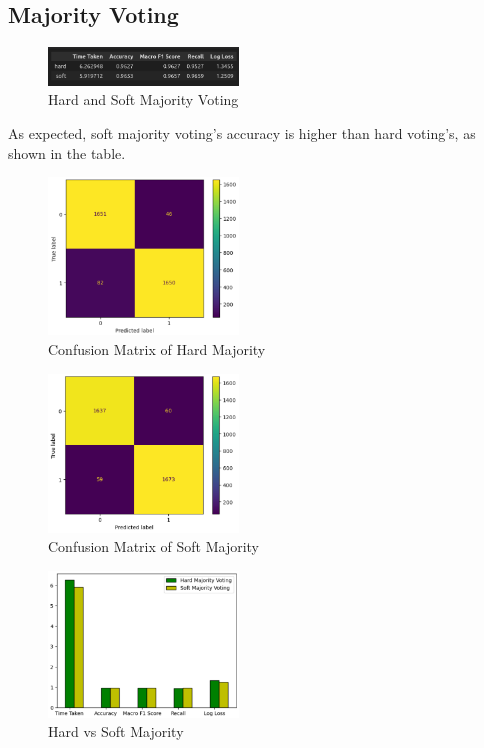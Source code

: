 \subsection{Majority Voting}
\begin{figure}[ht!]
    \centering
    \includegraphics[width = 0.45\textwidth]{./images/majority.png}
    \caption{Hard and Soft Majority Voting}
    \label{fig:6}
\end{figure}
As expected, soft majority voting's accuracy is higher than hard voting's, as shown in the table.
\begin{figure}[ht!]
    \centering
    \includegraphics[width = 0.45\textwidth]{./images/conf_hard.png}
    \caption{Confusion Matrix of Hard Majority}
    \label{fig:7}
\end{figure}
\begin{figure}[ht!]
    \centering
    \includegraphics[width = 0.45\textwidth]{./images/conf_soft.png}
    \caption{Confusion Matrix of Soft Majority}
    \label{fig:8}
\end{figure}
\begin{figure}[ht!]
    \centering
    \includegraphics[width = 0.45\textwidth]{./images/hard_soft.png}
    \caption{Hard vs Soft Majority}
    \label{fig:9}
\end{figure}
